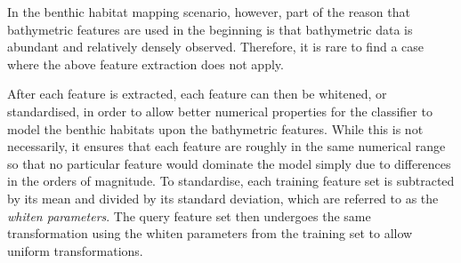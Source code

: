 		In the benthic habitat mapping scenario, however, part of the reason that bathymetric features are used in the beginning is that bathymetric data is abundant and relatively densely observed. Therefore, it is rare to find a case where the above feature extraction does not apply.
		
		After each feature is extracted, each feature can then be whitened, or standardised, in order to allow better numerical properties for the classifier to model the benthic habitats upon the bathymetric features. While this is not necessarily, it ensures that each feature are roughly in the same numerical range so that no particular feature would dominate the model simply due to differences in the orders of magnitude. To standardise, each training feature set is subtracted by its mean and divided by its standard deviation, which are referred to as the \textit{whiten parameters}. The query feature set then undergoes the same transformation using the whiten parameters from the training set to allow uniform transformations.
		
		
		